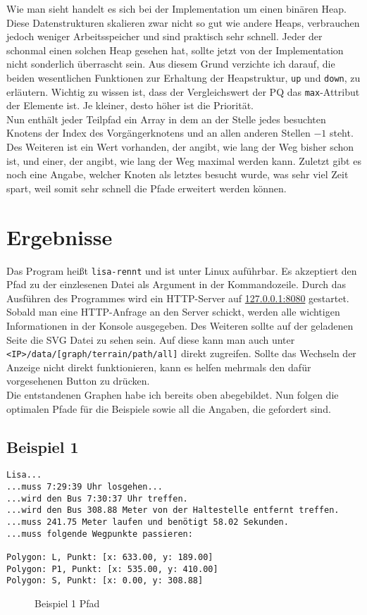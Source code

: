 \documentclass[a4paper,10pt,ngerman]{scrartcl}
\begin{document}
Wie man sieht handelt es sich bei der Implementation um einen binären Heap. Diese Datenstrukturen skalieren zwar nicht so gut wie andere Heaps, verbrauchen jedoch weniger Arbeitsspeicher und sind praktisch sehr schnell. Jeder der schonmal einen solchen Heap gesehen hat, sollte jetzt von der Implementation nicht sonderlich überrascht sein. Aus diesem Grund verzichte ich darauf, die beiden wesentlichen Funktionen zur Erhaltung der Heapstruktur, \texttt{up} und \texttt{down}, zu erläutern. Wichtig zu wissen ist, dass der Vergleichswert der PQ das \texttt{max}-Attribut der Elemente ist. Je kleiner, desto höher ist die Priorität.\\
Nun enthält jeder Teilpfad ein Array in dem an der Stelle jedes besuchten Knotens der Index des Vorgängerknotens und an allen anderen Stellen $-1$ steht. Des Weiteren ist ein Wert vorhanden, der angibt, wie lang der Weg bisher schon ist, und einer, der angibt, wie lang der Weg maximal werden kann. Zuletzt gibt es noch eine Angabe, welcher Knoten als letztes besucht wurde, was sehr viel Zeit spart, weil somit sehr schnell die Pfade erweitert werden können.
\section{Ergebnisse}
Das Program hei\ss t \texttt{lisa-rennt} und ist unter Linux auführbar. Es akzeptiert den Pfad zu der einzlesenen Datei als Argument in der Kommandozeile. Durch das Ausführen des Programmes wird ein HTTP-Server auf \url{127.0.0.1:8080} gestartet. Sobald man eine HTTP-Anfrage an den Server schickt, werden alle wichtigen Informationen in der Konsole ausgegeben. Des Weiteren sollte auf der geladenen Seite die SVG Datei zu sehen sein. Auf diese kann man auch unter \texttt{<IP>/data/[graph/terrain/path/all]} direkt zugreifen. Sollte das Wechseln der Anzeige nicht direkt funktionieren, kann es helfen mehrmals den dafür vorgesehenen Button zu drücken.\\
Die entstandenen Graphen habe ich bereits oben abegebildet. Nun folgen die optimalen Pfade für die Beispiele sowie all die Angaben, die gefordert sind.
\subsection{Beispiel 1}
\begin{verbatim}
Lisa...
...muss 7:29:39 Uhr losgehen...
...wird den Bus 7:30:37 Uhr treffen.
...wird den Bus 308.88 Meter von der Haltestelle entfernt treffen.
...muss 241.75 Meter laufen und benötigt 58.02 Sekunden.
...muss folgende Wegpunkte passieren:

Polygon: L, Punkt: [x: 633.00, y: 189.00]
Polygon: P1, Punkt: [x: 535.00, y: 410.00]
Polygon: S, Punkt: [x: 0.00, y: 308.88]  
\end{verbatim}
\begin{figure}[H]
  \def\svgwidth{\columnwidth} 
  
  \caption{Beispiel 1 Pfad}
\end{figure}
\end{document}
